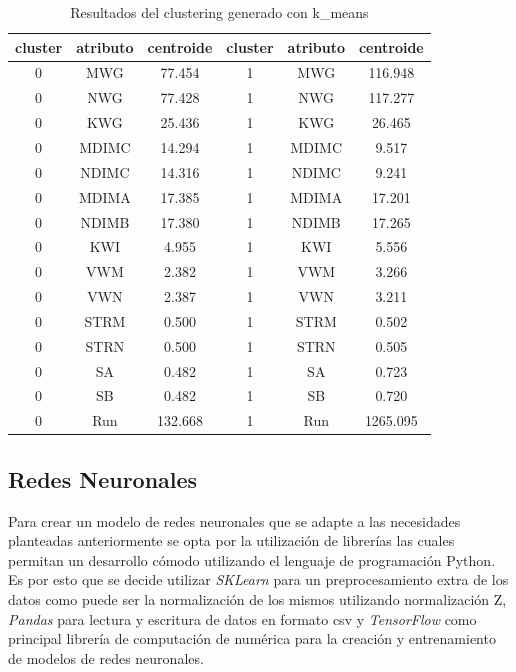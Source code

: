 \documentclass[osajnl,twocolumn,showpacs,superscriptaddress,10pt]{revtex4-1} %
\begin{document}
\begin{table}[h!]
    \centering
    \begin{tabular}{|ccc|ccc|}
        \hline
        cluster & atributo & centroide & cluster & atributo & centroide \\
        \hline
        0	& MWG & 77.454 & 1 &	MWG & 116.948 \\
        0	& NWG & 77.428 & 1 &	NWG & 117.277 \\
        0	& KWG & 25.436 & 1 &	KWG & 26.465 \\
        0	& MDIMC & 14.294 & 1 &	MDIMC & 9.517 \\
        0	& NDIMC & 14.316 & 1 &	NDIMC & 9.241 \\
        0	& MDIMA & 17.385 & 1 &	MDIMA & 17.201 \\
        0	& NDIMB & 17.380 & 1 &	NDIMB & 17.265 \\
        0	& KWI & 4.955 & 1 &	KWI & 5.556 \\
        0	& VWM & 2.382 & 1 &	VWM & 3.266 \\
        0	& VWN & 2.387 & 1 &	VWN & 3.211 \\
        0	& STRM & 0.500 & 1 &	STRM & 0.502 \\
        0	& STRN & 0.500 & 1 &	STRN & 0.505 \\
        0	& SA & 0.482 & 1 &	SA & 0.723 \\
        0	& SB & 0.482 & 1 &	SB & 0.720 \\
        0	& Run & 132.668 & 1 &	Run & 1265.095 \\
        \hline
    \end{tabular}
    \caption{Resultados del clustering generado con k\_means}
    \label{table:k_means}
\end{table}

\subsection{Redes Neuronales}

Para crear un modelo de redes neuronales que se adapte a las necesidades planteadas anteriormente se opta por la utilización de librerías las cuales permitan un desarrollo cómodo utilizando el lenguaje de programación Python. Es por esto que se decide utilizar \textit{SKLearn} para un preprocesamiento extra de los datos como puede ser la normalización de los mismos utilizando normalización Z, \textit{Pandas} para lectura y escritura de datos en formato csv y \textit{TensorFlow} como principal librería de computación de numérica para la creación y entrenamiento de modelos de redes neuronales. \\
\end{document}

